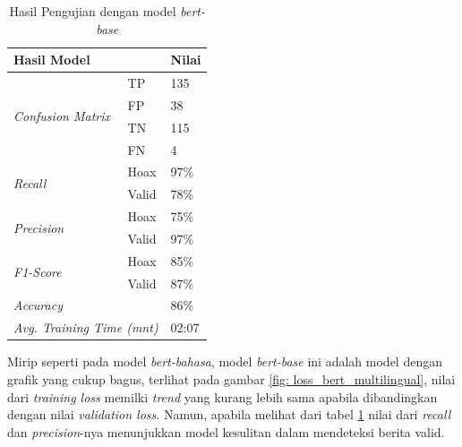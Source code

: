 \begin{table}[h]
    \caption{Hasil Pengujian dengan model \textit{bert-base}}
    \label{tab: loss_multilingual}
    \centering
    \begin{tabular}{|l|l|l|}
        \hline
        \multicolumn{2}{|l|}{\textbf{Hasil Model}}              & \textbf{Nilai}        \\ \hline
        \multirow{4}{*}{\textit{Confusion Matrix}}              & TP             & 135  \\ \cline{2-3}
                                                                & FP             & 38   \\ \cline{2-3}
                                                                & TN             & 115  \\ \cline{2-3}
                                                                & FN             & 4    \\ \hline
        \multirow{2}{*}{\textit{Recall}}                        & Hoax           & 97\% \\ \cline{2-3}
                                                                & Valid          & 78\% \\ \hline
        \multirow{2}{*}{\textit{Precision}}                     & Hoax           & 75\% \\ \cline{2-3}
                                                                & Valid          & 97\% \\ \hline
        \multirow{2}{*}{\textit{F1-Score}}                      & Hoax           & 85\% \\ \cline{2-3}
                                                                & Valid          & 87\% \\ \hline
        \multicolumn{2}{|l|}{\textit{Accuracy}}                 & 86\%                  \\ \hline
        \multicolumn{2}{|l|}{\textit{Avg. Training Time (mnt)}} & 02:07                 \\ \hline
    \end{tabular}
\end{table}

Mirip seperti pada model \textit{bert-bahasa}, model \textit{bert-base} ini adalah model dengan grafik yang cukup bagus, terlihat pada gambar \ref{fig: loss_bert_multilingual}, nilai dari \textit{training loss} memilki \textit{trend} yang kurang lebih sama apabila dibandingkan dengan nilai \textit{validation loss}. Namun, apabila melihat dari tabel \ref{tab: loss_multilingual} nilai dari \textit{recall} dan \textit{precision}-nya menunjukkan model kesulitan dalam mendeteksi berita valid.

